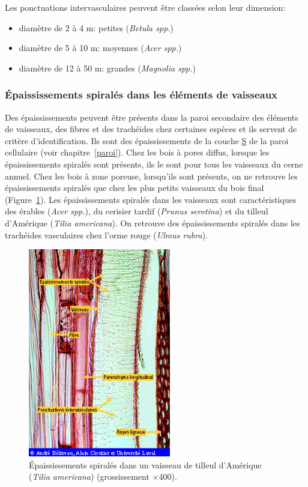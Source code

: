 Les ponctuations intervasculaires peuvent être classées selon leur dimension:

\begin{itemize}
\item diamètre de 2 à 4 \micro m:	petites (\textit{Betula spp.})
\item diamètre de 5 à 10 \micro m:	moyennes (\textit{Acer spp.})
\item diamètre de 12 à 50 \micro m:	grandes (\textit{Magnolia spp.})
\end{itemize}

\subsubsection{Épaississements spiralés dans les éléments de vaisseaux}\label{epais}

Des épaississements peuvent être présents dans la paroi secondaire des éléments de vaisseaux, des fibres et des trachéides chez certaines espèces et ils servent de critère d'identification. Ils sont des épaississements de la couche \hyperref[s3]{S} de la paroi cellulaire (voir chapitre~\ref{paroi}). Chez les bois à pores diffus, lorsque les épaississements spiralés sont présents, ils le sont pour tous les vaisseaux du cerne annuel. Chez les bois à zone poreuse, lorsqu'ils sont présents, on ne retrouve les épaississements spiralés  que chez les plus petits vaisseaux du bois final (Figure~\ref{vaiss_spiral}). Les épaississements spiralés dans les vaisseaux sont caractéristiques des érables (\textit{Acer spp.}), du cerisier tardif (\textit{Prunus serotina}) et du tilleul d'Amérique (\textit{Tilia americana}). On retrouve des épaississements spiralés dans les trachéides vasculaires chez l'orme rouge (\textit{Ulmus rubra}).

\begin{figure}[h]
\centering
\includegraphics[scale=0.8]{img/ch4_vaiss_spiral}
\caption{Épaississements spiralés dans un vaisseau de tilleul d'Amérique (\textit{Tilia americana}) (grossissement $\times$400).}
\label{vaiss_spiral}
\end{figure}

